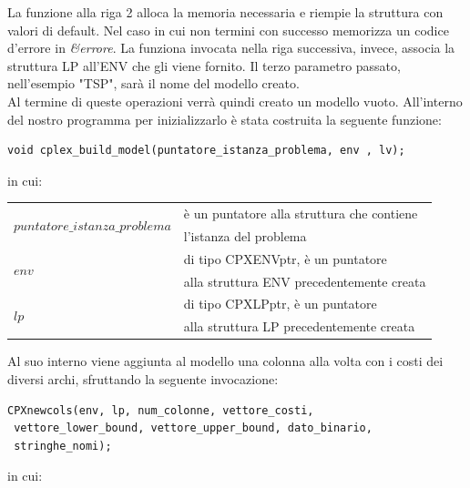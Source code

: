 

La funzione alla riga 2 alloca la memoria necessaria e riempie la struttura con valori di default. Nel caso in cui non termini con successo memorizza un codice d'errore in \textit{\&errore}. La funziona invocata nella riga successiva, invece, associa la struttura LP all'ENV che gli viene fornito. Il terzo parametro passato, nell'esempio "TSP", sarà il nome del modello creato.\\
Al termine di queste operazioni verrà quindi creato un modello vuoto. All'interno del nostro programma per inizializzarlo è stata costruita la seguente funzione:

\begin{lstlisting}[linewidth=370pt, basicstyle=\footnotesize\sffamily,] 
 void cplex_build_model(puntatore_istanza_problema, env , lv);
\end{lstlisting}

in cui:

\begin{table}[h]
\begin{tabular}{ll}
\multirow{2}{*}{$puntatore\_istanza\_problema$} & è un puntatore alla struttura che contiene \\
					&  l'istanza del problema \\
\multirow{2}{*}{$env$} & di tipo CPXENVptr, è un puntatore   \\
                  & alla struttura ENV precedentemente creata\\
\multirow{2}{*}{$lp$} & di tipo CPXLPptr, è un puntatore  \\
                  & alla struttura LP  precedentemente creata \\
\end{tabular}
\end{table}


Al suo interno viene aggiunta al modello una colonna alla volta con i costi dei diversi archi, sfruttando la seguente invocazione: 

\begin{lstlisting}[linewidth=350pt, basicstyle=\footnotesize\sffamily,]     
CPXnewcols(env, lp, num_colonne, vettore_costi,
 vettore_lower_bound, vettore_upper_bound, dato_binario, 
 stringhe_nomi);
\end{lstlisting}

in cui:

